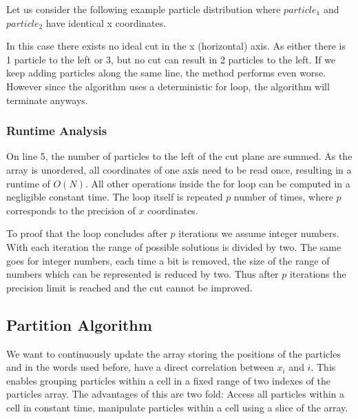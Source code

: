 \documentclass[]{article}
\begin{document}
Let us consider the following example particle distribution where $particle_1$ and $particle_2$ have identical x coordinates. 

\begin{figure}[H]
	\begin{center}
	\end{center}
\end{figure}

In this case there exists no ideal cut in the x (horizontal) axis. As either there is 1 particle to the left or 3, but no cut can result in 2 particles to the left. If we keep adding particles along the same line, the method performs even worse. However since the algorithm uses a deterministic for loop, the algorithm will terminate anyways. 


\subsubsection{Runtime Analysis}

On line 5, the number of particles to the left of the cut plane are summed. As the array is unordered, all coordinates of one axis need to be read once, resulting in a runtime of $O(N)$. All other operations inside the for loop can be computed in a negligible constant time. The loop itself is repeated $p$ number of times, where $p$ corresponds to the precision of $x$ coordinates.

To proof that the loop concludes after $p$ iterations we assume integer numbers. With each iteration the range of possible solutions is divided by two. The same goes for integer numbers, each time a bit is removed, the size of the range of numbers which can be represented is reduced by two. Thus after $p$ iterations the precision limit is reached and the cut cannot be improved.

\subsection{Partition Algorithm}\label{sec:part}

We want to continuously update the array storing the positions of the particles and in the words used before, have a direct correlation between $x_i$ and $i$. This enables grouping particles within a cell in a fixed range of two indexes of the particles array. The advantages of this are two fold: Access all particles within a cell in constant time, manipulate particles within a cell using a slice of the array. 
\end{document}
